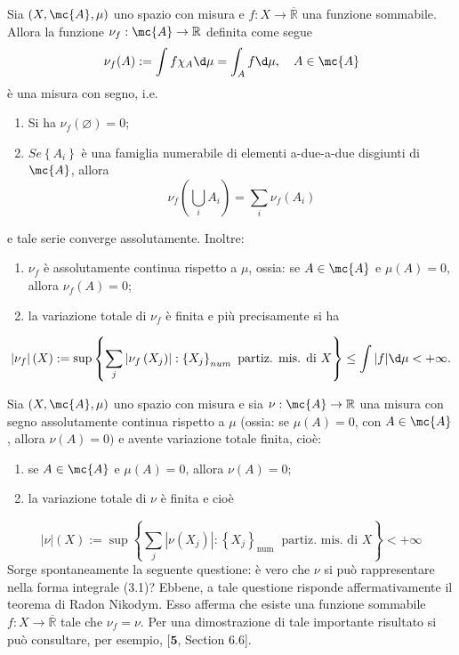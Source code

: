 \begin{corollary}\label{cor: 2.3}
    Sia $(X, \mc{A}, \mu)$ uno spazio con misura e $f: X \rightarrow \overline{\mathbb{R}}$ una funzione sommabile. Allora la funzione $\nu_{f}: \mc{A} \rightarrow \mathbb{R}$ definita come segue
    \[\nu_{f}(A):=\int f \chi_{A} \d \mu=\int_{A} f \d \mu, \quad A \in \mc{A}\]
    è una misura con segno, i.e.
    \begin{enumerate}
        \item Si ha $\nu_{f}(\varnothing)=0$;
        \item $S e\left\{A_{i}\right\}$ è una famiglia numerabile di elementi a-due-a-due disgiunti di $\mc{A}$, allora
        \[
        \nu_{f}\left(\bigcup_{i} A_{i}\right)=\sum_{i} \nu_{f}\left(A_{i}\right)
        \]
    \end{enumerate}
    e tale serie converge assolutamente. Inoltre:
    \begin{enumerate}[resume]
        \item $\nu_{f}$ è assolutamente continua rispetto a $\mu$, ossia: se $A \in \mc{A}$ e $\mu(A)=0$, allora $\nu_{f}(A)=0$; 
        \item la variazione totale di $\nu_{f}$ è finita e più precisamente si ha
    \end{enumerate}
    \[
    \left|\nu_{f}\right|(X) :=\sup \left\{\sum_{j}\left|\nu_{f}\left(X_{j}\right)\right|:\left\{X_{j}\right\}_{n u m} \text { partiz. mis. di } X\right\} \leq \int|f| \d \mu<+\infty .
    \]
\end{corollary}

\begin{oss}\label{oss: 2.11}
    Sia $(X, \mc{A}, \mu)$ uno spazio con misura e sia $\nu: \mc{A} \rightarrow \mathbb{R}$ una misura con segno assolutamente continua rispetto a $\mu$ (ossia: se $\mu(A)=0$, con $A \in \mc{A}$, allora $\nu(A)=0)$ e avente variazione totale finita, cioè:
    \begin{enumerate}[label=$\roman*)$]
        \item se $A \in \mc{A}$ e $\mu(A)=0$, allora $\nu(A)=0$;
        \item la variazione totale di $\nu$ è finita e cioè
    \end{enumerate}
    \[|\nu|(X):=\sup \left\{\sum_{j}\left|\nu\left(X_{j}\right)\right|:\left\{X_{j}\right\}_{\text {num }} \text { partiz. mis. di } X\right\}<+\infty\]
    Sorge spontaneamente la seguente questione: è vero che $\nu$ si può rappresentare nella forma integrale (3.1)? Ebbene, a tale questione risponde affermativamente il teorema di Radon Nikodym. Esso afferma che esiste una funzione sommabile $f: X \rightarrow \overline{\mathbb{R}}$ tale che $\nu_{f}=\nu$. Per una dimostrazione di tale importante risultato si può consultare, per esempio, $[\mathbf{5}$, Section 6.6].
\end{oss}
